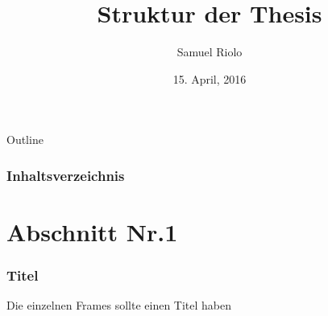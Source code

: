 \documentclass{beamer}
\title[Energie in der Informatik]{Struktur der Thesis}
\author{Samuel Riolo}
\institute{FFHS}
\date{15. April, 2016}
\begin{document}
\begin{frame}
  \titlepage
\end{frame}

\begin{frame}{Outline}
\frametitle{Inhaltsverzeichnis}
    \tableofcontents[]
\end{frame}

\section{Abschnitt Nr.1} 
\begin{frame}
\frametitle{Titel} 
Die einzelnen Frames sollte einen Titel haben 
\end{frame}
\end{document}
